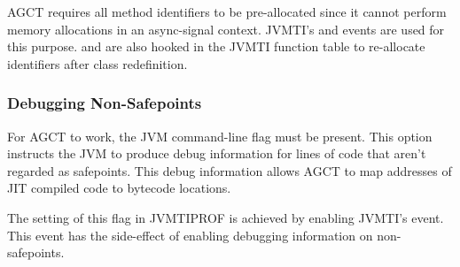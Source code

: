 AGCT requires all method identifiers to be pre-allocated since it cannot perform memory allocations in an async-signal context. JVMTI's  and  events are used for this purpose.  and  are also hooked in the JVMTI function table to re-allocate identifiers after class redefinition.

\subsubsection*{Debugging Non-Safepoints}

For AGCT to work, the JVM command-line flag  must be present. This option instructs the JVM to produce debug information for lines of code that aren't regarded as safepoints. This debug information allows AGCT to map addresses of JIT compiled code to bytecode locations.

The setting of this flag in JVMTIPROF is achieved by enabling JVMTI's  event. This event has the side-effect of enabling debugging information on non-safepoints.





